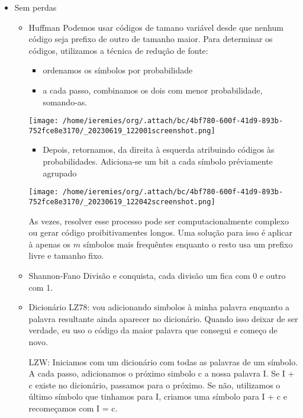 \documentclass[twocolumn, 9pt]{article}
\begin{document}
\begin{itemize}
\item Sem perdas
\label{sec:orgee78416}
\begin{itemize}
\item Huffman
\label{sec:org025d030}
Podemos usar códigos de tamano variável desde que nenhum código seja prefixo de outro de tamanho maior.
Para determinar os códigos, utilizamos a técnica de redução de fonte:
\begin{itemize}
\item ordenamos os símbolos por probabilidade
\item a cada passo, combinamos os dois com menor probabilidade, somando-as.
\end{itemize}
\begin{center}
\texttt{[image: /home/ieremies/org/.attach/bc/4bf780-600f-41d9-893b-752fce8e3170/\_20230619\_122001screenshot.png]}
\end{center}
\begin{itemize}
\item Depois, retornamos, da direita à esquerda atribuindo códigos às probabilidades. Adiciona-se um bit a cada símbolo préviamente agrupado
\end{itemize}
\begin{center}
\texttt{[image: /home/ieremies/org/.attach/bc/4bf780-600f-41d9-893b-752fce8e3170/\_20230619\_122042screenshot.png]}
\end{center}

As vezes, resolver esse processo pode ser computacionalmente complexo ou gerar código proibitivamentes longos.
Uma solução para isso é aplicar à apenas os \(m\) símbolos mais frequêntes enquanto o resto usa um prefixo livre e tamanho fixo.
\item Shannon-Fano
\label{sec:org1f646ad}
Divisão e conquista, cada divisão um fica com 0 e outro com 1.
\item Dicionário
\label{sec:org90b4eba}
LZ78: vou adicionando simbolos à minha palavra enquanto a palavra resultante ainda aparecer no dicionário. Quando isso deixar de ser verdade, eu uso o código da maior palavra que consegui e começo de novo.

LZW: Iniciamos com um dicionário com todas as palavras de um símbolo. A cada passo, adicionamos o próximo simbolo c a nossa palavra I. Se I + c existe no dicionário, passamos para o próximo. Se não, utilizamos o último símbolo que tinhamos para I, criamos uma símbolo para I + c e recomeçamos com I = c.


\end{itemize}
\end{itemize}
\end{document}
